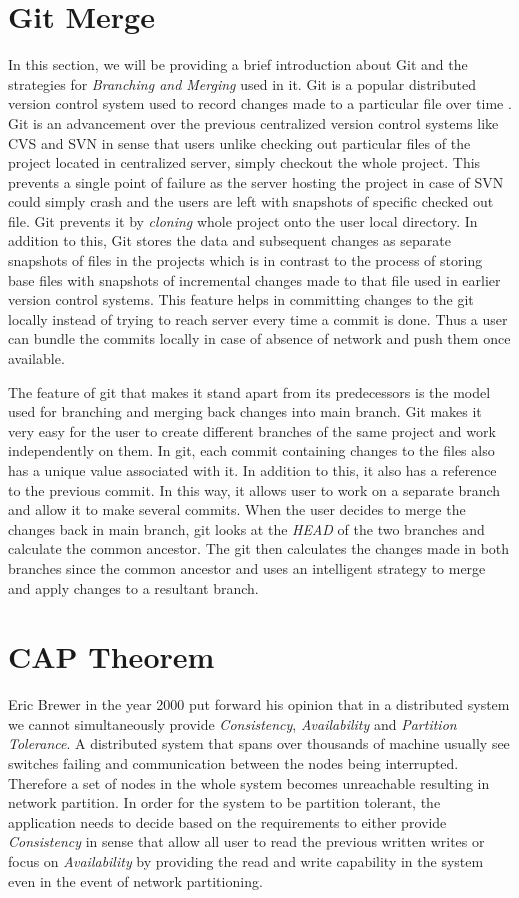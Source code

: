 \documentclass[a4paper,11pt]{kth-mag}
\begin{document}
\section{Git Merge}
In this section, we will be providing a brief introduction about Git and the strategies for \textit{Branching and Merging} \cite{gitmerge} used in it. Git is a popular distributed version control system used to record changes made to a particular file over time \cite{gitVersionControl}. Git is an advancement over the previous centralized version control systems like CVS \cite{cvs} and SVN \cite{svn} in sense that users unlike checking out particular files of the project located in centralized server, simply checkout the whole project. This prevents a single point of failure as the server hosting the project in case of SVN could simply crash and the users are left with snapshots of specific checked out file. Git prevents it by \textit{cloning} whole project onto the user local directory. In addition to this, Git stores the data and subsequent changes as separate snapshots of files in the projects which is in contrast to the process of storing base files with snapshots of incremental changes made to that file used in earlier version control systems. This feature helps in committing changes to the git locally instead of trying to reach server every time a commit is done. Thus a user can bundle the commits locally in case of absence of network and push them once available.
\par The feature of git that makes it stand apart from its predecessors is the model used for branching and merging back changes into main branch. Git makes it very easy for the user to create different branches of the same project and work independently on them. In git, each commit containing changes to the files also has a unique value associated with it. In addition to this, it also has a reference to the previous commit. In this way, it allows user to work on a separate branch and allow it to make several commits. When the user decides to merge the changes back in main branch, git looks at the \textit{HEAD} of the two branches and calculate the common ancestor. The git then calculates the changes made in both branches since the common ancestor and uses an intelligent strategy to merge and apply changes to a resultant branch.


\section{CAP Theorem}
Eric Brewer in the year 2000 put forward his opinion that in a distributed system we cannot simultaneously provide \textit{Consistency}, \textit{Availability} and \textit{Partition Tolerance}. A distributed system that spans over thousands of machine usually see switches failing and communication between the nodes being interrupted. Therefore a set of nodes in the whole system becomes unreachable resulting in network partition. In order for the system to be partition tolerant, the application needs to decide based on the requirements to either provide \textit{Consistency} in sense that allow all user to read the previous written writes or focus on \textit{Availability} by providing the read and write capability in the system even in the event of network partitioning.
\end{document}
